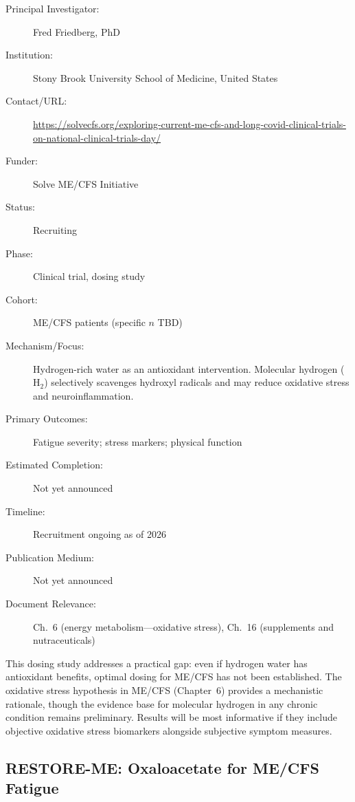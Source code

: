 \begin{description}
    \item[Principal Investigator:] Fred Friedberg, PhD
    \item[Institution:] Stony Brook University School of Medicine,
        United States
    \item[Contact/URL:] \url{https://solvecfs.org/exploring-current-me-cfs-and-long-covid-clinical-trials-on-national-clinical-trials-day/}
    \item[Funder:] Solve ME/CFS Initiative
    \item[Status:] Recruiting
    \item[Phase:] Clinical trial, dosing study
    \item[Cohort:] ME/CFS patients (specific $n$ TBD)
    \item[Mechanism/Focus:] Hydrogen-rich water as an antioxidant
        intervention.  Molecular hydrogen ($\mathrm{H}_2$) selectively
        scavenges hydroxyl radicals and may reduce oxidative stress and
        neuroinflammation.
    \item[Primary Outcomes:] Fatigue severity; stress markers; physical
        function
    \item[Estimated Completion:] Not yet announced
    \item[Timeline:] Recruitment ongoing as of 2026
    \item[Publication Medium:] Not yet announced
    \item[Document Relevance:] Ch.~6 (energy metabolism---oxidative stress),
        Ch.~16 (supplements and nutraceuticals)
\end{description}

This dosing study addresses a practical gap: even if hydrogen water has
antioxidant benefits, optimal dosing for ME/CFS has not been established.
The oxidative stress hypothesis in ME/CFS (Chapter~6) provides a mechanistic
rationale, though the evidence base for molecular hydrogen in any chronic
condition remains preliminary.  Results will be most informative if they
include objective oxidative stress biomarkers alongside subjective symptom
measures.

\subsection{RESTORE-ME: Oxaloacetate for ME/CFS Fatigue}
\label{sec:registry-restore-me}

